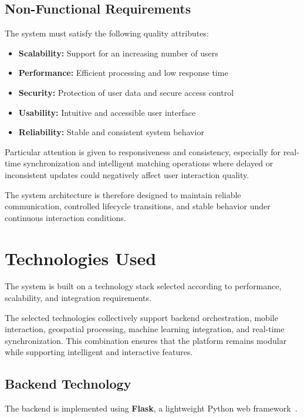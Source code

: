 \subsection{Non-Functional Requirements}

The system must satisfy the following quality attributes:

\begin{itemize}
    \item \textbf{Scalability:} Support for an increasing number of users
    \item \textbf{Performance:} Efficient processing and low response time
    \item \textbf{Security:} Protection of user data and secure access control
    \item \textbf{Usability:} Intuitive and accessible user interface
    \item \textbf{Reliability:} Stable and consistent system behavior
\end{itemize}

Particular attention is given to responsiveness and consistency, especially for real-time synchronization and intelligent matching operations where delayed or inconsistent updates could negatively affect user interaction quality.

The system architecture is therefore designed to maintain reliable communication, controlled lifecycle transitions, and stable behavior under continuous interaction conditions.

\section{Technologies Used}

The system is built on a technology stack selected according to performance, scalability, and integration requirements.

The selected technologies collectively support backend orchestration, mobile interaction, geospatial processing, machine learning integration, and real-time synchronization. This combination ensures that the platform remains modular while supporting intelligent and interactive features.

\subsection{Backend Technology}

The backend is implemented using \textbf{Flask}, a lightweight Python web framework~\cite{flask}.

